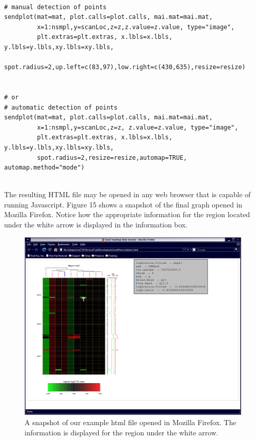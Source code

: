 \documentclass[]{article}
\begin{document}
\begin{verbatim}

# manual detection of points
sendplot(mat=mat, plot.calls=plot.calls, mai.mat=mai.mat,
         x=1:nsmpl,y=scanLoc,z=z,z.value=z.value, type="image",
         plt.extras=plt.extras, x.lbls=x.lbls, y.lbls=y.lbls,xy.lbls=xy.lbls, 
         spot.radius=2,up.left=c(83,97),low.right=c(430,635),resize=resize)


# or 
# automatic detection of points
sendplot(mat=mat, plot.calls=plot.calls, mai.mat=mai.mat,
         x=1:nsmpl,y=scanLoc,z=z, z.value=z.value, type="image",
         plt.extras=plt.extras, x.lbls=x.lbls, y.lbls=y.lbls,xy.lbls=xy.lbls, 
         spot.radius=2,resize=resize,automap=TRUE, automap.method="mode")


\end{verbatim}


The resulting HTML file may be opened in any web browser that is capable of running Javascript. Figure 15 shows a snapshot of the final graph opened in Mozilla Firefox. Notice how the appropriate information for the region located under the white arrow is displayed in the information box.

\begin{center}
\begin{figure}
\includegraphics{sendPlot4}
\caption{A snapshot of our example html file opened in Mozilla Firefox. The information is displayed for the region under the white arrow.}
\end{figure}
\end{center}
\end{document}
